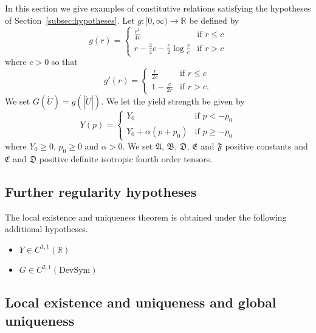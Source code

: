 In this section we give examples of constitutive relations satisfying the hypotheses of Section~\ref{subsec:hypotheses}. Let $g\colon[0,\infty)\to\mathbb{R}$ be defined by
\[
g(r)=
\begin{cases}
\frac{r^2}{4c} & \text{if $r\le c$} \\
r-\frac{3}{4}c-\frac{c}{2}\log\frac{r}{c} & \text{if $r>c$}
\end{cases}
\]
where $c>0$ so that
\[
g'(r)=
\begin{cases}
\frac{r}{2c} & \text{if $r\le c$} \\
1-\frac{c}{2r} & \text{if $r>c$}.
\end{cases}
\]
We set $G(\dot{U})=g(|\dot{U}|)$. We let the yield strength be given by
\[
Y(p)=
\begin{cases}
Y_0 & \text{if $p<-p_0$} \\
Y_0+\alpha(p+p_0) & \text{if $p\ge-p_0$}
\end{cases}
\]
where $Y_0\ge0$, $p_0\ge0$ and $\alpha>0$. We set $\mathfrak{A}$, $\mathfrak{B}$, $\mathfrak{D}$, $\mathfrak{E}$ and $\mathfrak{F}$ positive constants and $\mathfrak{C}$ and $\mathfrak{D}$ positive definite isotropic fourth order tensors.

\subsection{Further regularity hypotheses}
\label{subsec:further-hypotheses}

The local existence and uniqueness theorem is obtained under the following additional hypotheses.
\begin{itemize}
\item[(Y')] $Y\in C^{1,1}(\mathbb{R})$
\item[(G')] $G\in C^{2,1}(\text{DevSym})$
\end{itemize}

\subsection{Local existence and uniqueness and global uniqueness}
\label{subsec:uniqueness}

